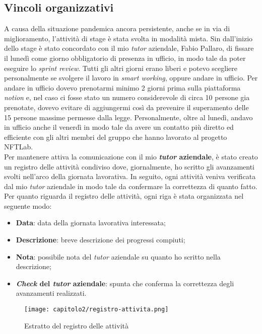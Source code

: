 \subsection{Vincoli organizzativi}
A causa della situazione pandemica ancora persistente, anche se in via di miglioramento, l'attività di stage è stata svolta in modalità mista. Sin dall'inizio dello stage è stato concordato con il mio \textit{tutor} aziendale, Fabio Pallaro, di fissare il lunedì come giorno obbligatorio di presenza in ufficio, in modo tale da poter eseguire lo \textit{sprint review}. 
Tutti gli altri giorni erano liberi e potevo scegliere personalmente se svolgere il lavoro in \textit{smart working}, oppure andare in ufficio. Per andare in ufficio dovevo prenotarmi minimo 2 giorni prima sulla piattaforma \textit{notion} e, nel caso ci fosse stato un numero considerevole di circa 10 persone gia prenotate, dovevo evitare di aggiungermi così da prevenire il superamento delle 15 persone massime permesse dalla legge.
Personalmente, oltre al lunedì, andavo in ufficio anche il venerdì in modo tale da avere un contatto più diretto ed efficiente con gli altri membri del gruppo che hanno lavorato al progetto NFTLab.\\

Per mantenere attiva la comunicazione con il mio \textbf{\textit{tutor} aziendale}, è stato creato un registro delle attività condiviso dove, giornalmente, ho scritto gli avanzamenti svolti nell'arco della giornata lavorativa. In seguito, ogni attività veniva verificata dal mio \textit{tutor} aziendale in modo tale da confermare la correttezza di quanto fatto. Per quanto riguarda il registro delle attività, ogni riga è stata organizzata nel seguente modo:
\begin{itemize}
  \item \textbf{Data}: data della giornata lavorativa interessata;
  \item \textbf{Descrizione}: breve descrizione dei progressi compiuti; 
  \item \textbf{Nota}: possibile nota del \textit{tutor} aziendale su quanto ho scritto nella descrizione;
  \item \textbf{\textit{Check} del \textit{tutor} aziendale}: spunta che conferma la correttezza degli avanzamenti realizzati.
\end{itemize}

\clearpage

\begin{figure}[!h]
  \centering
  \texttt{[image: capitolo2/registro-attivita.png]}
  \caption{Estratto del registro delle attività}
\end{figure}

